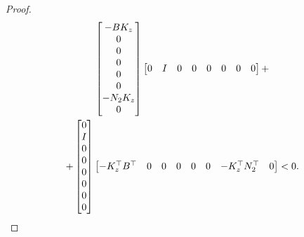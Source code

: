 \begin{proof}
\begin{multline}
\begin{bmatrix}
		-B K_z \\0\\0\\0\\0\\0\\-N_2 K_z\\0
	\end{bmatrix}
	\begin{bmatrix}
		0 & I & 0&0&0&0&0&0
	\end{bmatrix}
	+\\
	+
	\begin{bmatrix}
		0 \\I\\0\\0\\0\\0\\0\\0
	\end{bmatrix}
	\begin{bmatrix}
		-K_z^\top B^\top & 0 & 0&0&0&0&-{K}_z^\top{N}_2^\top&0
	\end{bmatrix}
	<0.
	\end{multline}
	

\end{proof}
